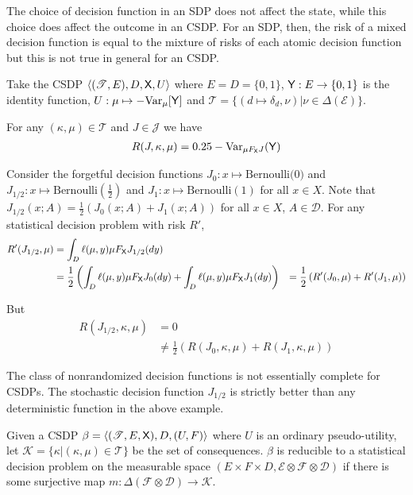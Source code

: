 \begin{example}\label{ex:ired_csdp}
The choice of decision function in an SDP does not affect the state, while this choice does affect the outcome in an CSDP. For an SDP, then, the risk of a mixed decision function is equal to the mixture of risks of each atomic decision function but this is not true in general for an CSDP.

Take the CSDP $\langle (\mathscr{T}, E), D, \mathsf{X}, U \rangle$ where $E=D=\{0,1\}$, $\mathsf{Y}:E\to \{0,1\}$ is the identity function, $U:\mu\mapsto -\text{Var}_\mu[\mathsf{Y}]$ and $\mathscr{T}=\{(d\mapsto \delta_d,\nu)|\nu\in \Delta(\mathcal{E})\}$.

For any $(\kappa,\mu)\in \mathscr{T}$ and $J\in\mathscr{J}$ we have
\begin{align}
    R(J,\kappa,\mu) = 0.25-\text{Var}_{\mu F_{\mathsf{X}} J}(\mathsf{Y})
\end{align}

Consider the forgetful decision functions $J_0:x\mapsto \text{Bernoulli(0)}$ and $J_{1/2}:x\mapsto \mathrm{Bernoulli(\tfrac{1}{2})}$ and $J_1:x\mapsto \mathrm{Bernoulli(1)}$ for all $x\in X$. Note that $J_{1/2}(x;A) = \tfrac{1}{2}(J_0(x;A)+J_1(x;A))$ for all $x\in X$, $A\in \mathcal{D}$. For any statistical decision problem with risk $R'$,
\begin{align}
    R'(J_{1/2},\mu) &= \int_D \ell(\mu,y) \mu F_{\mathsf{X}} J_{1/2}(dy)\\
                    &= \frac{1}{2}\left(\int_D \ell(\mu,y) \mu F_{\mathsf{X}} J_{0}(dy) + \int_D \ell(\mu,y) \mu F_{\mathsf{X}} J_{1}(dy)\right)
                    &= \frac{1}{2}\left(R'(J_0,\mu) + R'(J_1,\mu) \right)
\end{align}

But
\begin{align}
    R(J_{1/2},\kappa,\mu) &= 0\\
                          &\neq \frac{1}{2}\left(R(J_0,\kappa,\mu) + R(J_1,\kappa,\mu)\right)
\end{align}

\end{example}

\begin{corollary}
The class of nonrandomized decision functions is not essentially complete for CSDPs. The stochastic decision function $J_{1/2}$ is strictly better than any deterministic function in the above example.
\end{corollary}


\begin{theorem}\label{th:red_CSDP}
Given a CSDP $\beta=\langle (\mathscr{T},E,\mathsf{X}),D,(U,F)\rangle$ where $U$ is an ordinary pseudo-utility, let $\mathscr{K}=\{\kappa|(\kappa,\mu)\in \mathscr{T}\}$ be the set of consequences. $\beta$ is reducible to a statistical decision problem on the measurable space $(E\times F\times D,\mathcal{E}\otimes \mathcal{F}\otimes \mathcal{D})$ if there is some surjective map $m:\Delta(\mathcal{F}\otimes\mathcal{D})\to \mathscr{K}$.
\end{theorem}

